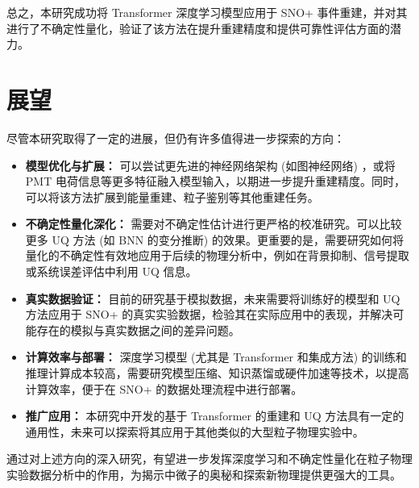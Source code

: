 总之，本研究成功将 Transformer 深度学习模型应用于 SNO+ 事件重建，并对其进行了不确定性量化，验证了该方法在提升重建精度和提供可靠性评估方面的潜力。

\section{展望}

尽管本研究取得了一定的进展，但仍有许多值得进一步探索的方向：
\begin{itemize}
    \item \textbf{模型优化与扩展：} 可以尝试更先进的神经网络架构 (如图神经网络) ，或将 PMT 电荷信息等更多特征融入模型输入，以期进一步提升重建精度。同时，可以将该方法扩展到能量重建、粒子鉴别等其他重建任务。
    \item \textbf{不确定性量化深化：} 需要对不确定性估计进行更严格的校准研究。可以比较更多 UQ 方法 (如 BNN 的变分推断) 的效果。更重要的是，需要研究如何将量化的不确定性有效地应用于后续的物理分析中，例如在背景抑制、信号提取或系统误差评估中利用 UQ 信息。
    \item \textbf{真实数据验证：} 目前的研究基于模拟数据，未来需要将训练好的模型和 UQ 方法应用于 SNO+ 的真实实验数据，检验其在实际应用中的表现，并解决可能存在的模拟与真实数据之间的差异问题。
    \item \textbf{计算效率与部署：} 深度学习模型 (尤其是 Transformer 和集成方法) 的训练和推理计算成本较高，需要研究模型压缩、知识蒸馏或硬件加速等技术，以提高计算效率，便于在 SNO+ 的数据处理流程中进行部署。
    \item \textbf{推广应用：} 本研究中开发的基于 Transformer 的重建和 UQ 方法具有一定的通用性，未来可以探索将其应用于其他类似的大型粒子物理实验中。
\end{itemize}

通过对上述方向的深入研究，有望进一步发挥深度学习和不确定性量化在粒子物理实验数据分析中的作用，为揭示中微子的奥秘和探索新物理提供更强大的工具。






